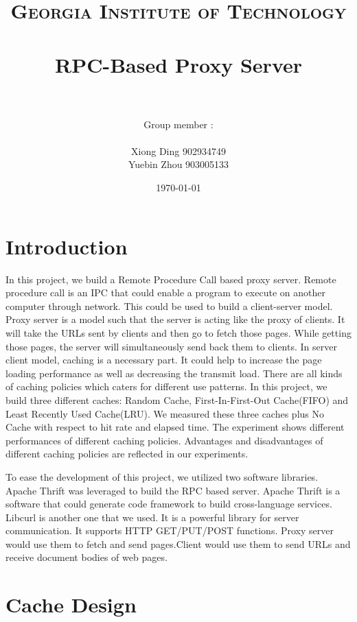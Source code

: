 \documentclass[paper=a4, fontsize=11pt]{scrartcl} %
\title{	
\normalfont \normalsize 
\textsc{Georgia Institute of Technology } \\ [25pt] %
\horrule{0.5pt} \\[0.4cm] %
\huge RPC-Based Proxy Server \\ %
\horrule{2pt} \\[0.5cm] %
}
\author{Group member : \\
\\
 Xiong Ding 902934749 \\ 
 Yuebin Zhou 903005133
} %
\date{\normalsize\today} %
\numberwithin{equation}{section} %
\numberwithin{figure}{section} %
\numberwithin{table}{section} %
\begin{document}
\maketitle %


\section{Introduction}

In this project, we build a Remote Procedure Call based proxy server. Remote procedure call is an IPC that could enable a program to execute on another computer through network. This could be used to build a client-server model. Proxy server is a model such that the server is acting like the proxy of clients. It will take the URLs sent by clients and then go to fetch those pages. While getting those pages, the server will simultaneously send back them to clients. In server client model, caching is a necessary part. It could help to increase the page loading performance as well as decreasing the transmit load. There are all kinds of caching policies which caters for different use patterns. In this project, we build three different caches: Random Cache, First-In-First-Out Cache(FIFO) and Least Recently Used Cache(LRU). We measured these three caches plus No Cache with respect to hit rate and elapsed time. The experiment shows different performances of different caching policies. Advantages and disadvantages of different caching policies are reflected in our experiments.


To ease the development of this project, we utilized two software libraries. Apache Thrift was leveraged to build the RPC based server. Apache Thrift is a software that could generate code framework to build cross-language services. Libcurl is another one that we used. It is a powerful library for server communication. It supports HTTP GET/PUT/POST functions. Proxy server would use them to fetch and send pages.Client would use them to send URLs and receive document bodies of web pages. 



\section{Cache Design}
\end{document}
